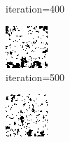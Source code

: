 \documentclass{article}
\begin{document}
\begin{figure}[h]
\begin{subfigure}[t]{0.18\textwidth}
\vspace{-0.6cm}
\caption{iteration=400}
\end{subfigure}\hspace{0.01\textwidth}
\begin{subfigure}[t]{0.18\textwidth}
\centering
\includegraphics[width=\textwidth]{./computational/results/gibbs_node_sampler_positive_iter_500.png}
\vspace{-0.6cm}
\caption{iteration=500}
\end{subfigure}\hspace{0.01\textwidth}
\begin{subfigure}[t]{0.18\textwidth}
\centering
\includegraphics[width=\textwidth]{./computational/results/gibbs_node_sampler_positive_iter_600.png}

\end{subfigure}
\end{figure}
\end{document}
